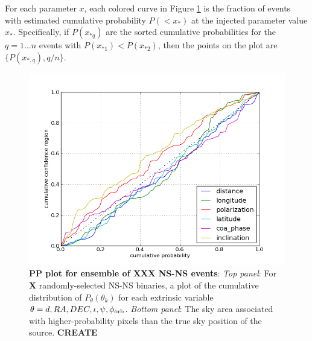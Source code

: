 
For each parameter $x$, each colored curve in Figure  \ref{fig:pp:2015Ensemble} is  the fraction of events with
estimated cumulative probability $P(<x_*)$ at the injected parameter value $x_*$.  
Specifically, if $P(x_{*q})$ are the sorted cumulative probabilities for the $q=1\ldots n$ events with
$P(x_{*1})<P(x_{*2})$, then the points on the plot are $\{P(x_{*,q}),q/n\}$.  
%

\begin{figure}
\includegraphics[width=\columnwidth]{../Figures/v2_2015_BNS_MDC_skysampling_pp_plot}  %
\caption{\label{fig:pp:2015Ensemble}\textbf{PP plot for ensemble of XXX NS-NS events}: \emph{Top panel}: For \textbf{X} randomly-selected NS-NS binaries, a plot of
  the cumulative distribution of $P_\theta(\theta_k)$ for each extrinsic variable $\theta=d,RA,DEC,\iota,\psi,\phi_{\rm
    orb}$.
\emph{Bottom panel}: The sky area associated with higher-probability pixels than the true sky position of the source. \textbf{CREATE}
}
\end{figure}


